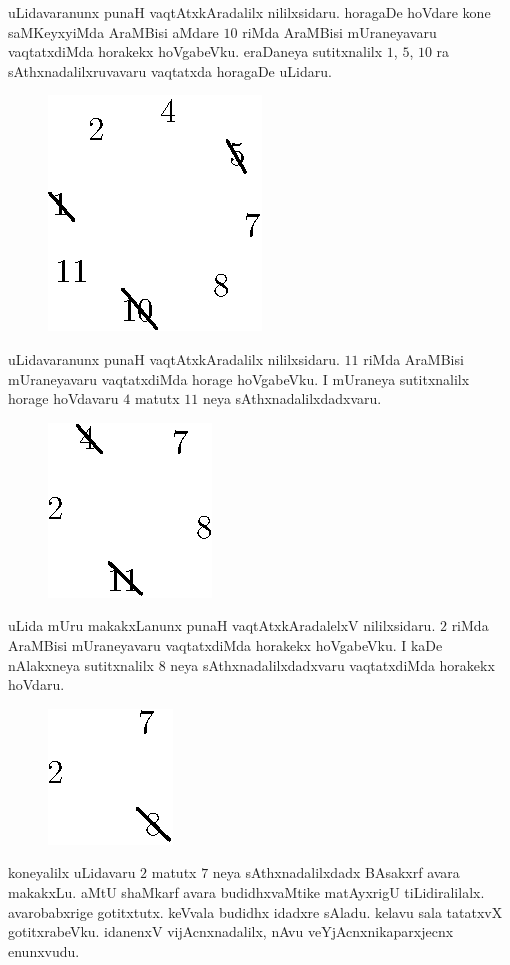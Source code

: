 uLidavaranunx punaH vaqtAtxkAradalilx nililxsidaru. horagaDe hoVdare kone saMKeyxyiMda AraMBisi aMdare $10$ riMda AraMBisi mUraneyavaru vaqtatxdiMda horakekx hoVgabeVku. eraDaneya sutitxnalilx $1$, $5$, $10$ ra sAthxnadalilxruvavaru vaqtatxda horagaDe uLidaru.
\begin{figure}[H]
\centering
\includegraphics{src/figures/fig3.eps}
\end{figure}

uLidavaranunx punaH vaqtAtxkAradalilx nililxsidaru. $11$ riMda AraMBisi mUraneyavaru vaqtatxdiMda horage hoVgabeVku. I mUraneya sutitxnalilx horage hoVdavaru $4$ matutx $11$ neya sAthxnadalilxdadxvaru. 
\begin{figure}[H]
\centering
\includegraphics{src/figures/fig4.eps}
\end{figure}

uLida mUru makakxLanunx punaH vaqtAtxkAradalelxV nililxsidaru. $2$ riMda AraMBisi mUraneyavaru vaqtatxdiMda horakekx hoVgabeVku. I kaDe nAlakxneya sutitxnalilx $8$ neya sAthxnadalilxdadxvaru vaqtatxdiMda horakekx hoVdaru.
\begin{figure}[H]
\centering
\includegraphics{src/figures/fig5.eps}
\end{figure}

koneyalilx uLidavaru $2$ matutx $7$ neya sAthxnadalilxdadx BAsakxrf avara makakxLu. aMtU shaMkarf avara budidhxvaMtike matAyxrigU tiLidiralilalx. avarobabxrige gotitxtutx. keVvala budidhx idadxre sAladu. kelavu sala tatatxvX gotitxrabeVku. idanenxV vijAcnxnadalilx, nAvu veYjAcnxnikaparxjecnx enunxvudu. 
